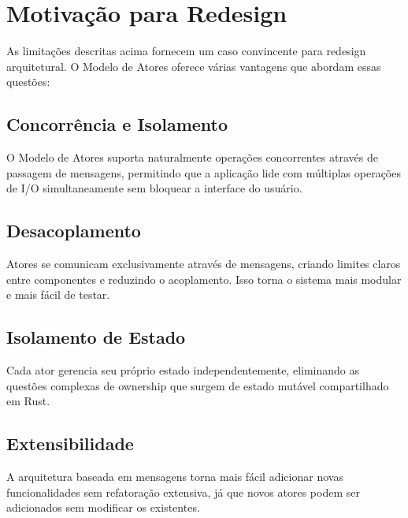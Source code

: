\section{Motivação para Redesign}

As limitações descritas acima fornecem um caso convincente para redesign arquitetural. O Modelo de Atores oferece várias vantagens que abordam essas questões:

\subsection{Concorrência e Isolamento}

O Modelo de Atores suporta naturalmente operações concorrentes através de passagem de mensagens, permitindo que a aplicação lide com múltiplas operações de I/O simultaneamente sem bloquear a interface do usuário.

\subsection{Desacoplamento}

Atores se comunicam exclusivamente através de mensagens, criando limites claros entre componentes e reduzindo o acoplamento. Isso torna o sistema mais modular e mais fácil de testar.

\subsection{Isolamento de Estado}

Cada ator gerencia seu próprio estado independentemente, eliminando as questões complexas de ownership que surgem de estado mutável compartilhado em Rust.

\subsection{Extensibilidade}

A arquitetura baseada em mensagens torna mais fácil adicionar novas funcionalidades sem refatoração extensiva, já que novos atores podem ser adicionados sem modificar os existentes.

